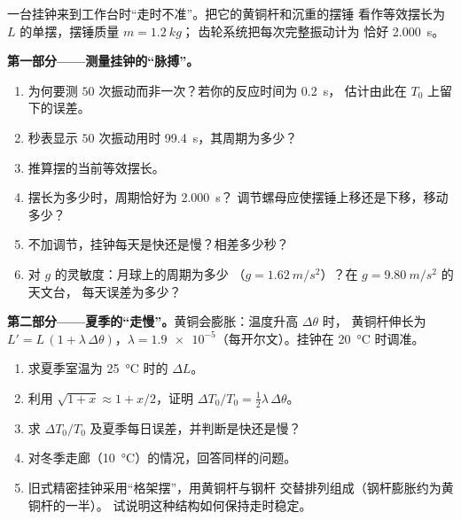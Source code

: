 \begin{problem}
\label{pb:g12:oscillators-and-time:1}
一台挂钟来到工作台时“走时不准”。把它的黄铜杆和沉重的摆锤
看作等效摆长为 $L$ 的单摆，摆锤质量 $m = \qty{1.2}{kg}$；
齿轮系统把每次完整振动计为
恰好 \qty{2.000}{s}。

\medskip
\noindent\textbf{第一部分——测量挂钟的“脉搏”。}
\begin{enumerate}
  \item 为何要测 $50$ 次振动而非一次？若你的反应时间为 \qty{0.2}{s}，
        估计由此在 $T_0$ 上留下的误差。
  \item 秒表显示 $50$ 次振动用时 \qty{99.4}{s}，其周期为多少？
  \item 推算摆的当前等效摆长。
  \item 摆长为多少时，周期恰好为 \qty{2.000}{s}？
        调节螺母应使摆锤上移还是下移，移动多少？
  \item 不加调节，挂钟每天是快还是慢？相差多少秒？
  \item 对 $g$ 的灵敏度：月球上的周期为多少
        （$g = \qty{1.62}{m/s^2}$）？在 $g = \qty{9.80}{m/s^2}$ 的天文台，
        每天误差为多少？
\end{enumerate}

\medskip
\noindent\textbf{第二部分——夏季的“走慢”。}黄铜会膨胀：温度升高 $\Delta\theta$ 时，
黄铜杆伸长为 $L' = L\,(1 + \lambda\,
\Delta\theta)$，$\lambda = \num{1.9e-5}$（每开尔文）。挂钟在
\qty{20}{\celsius} 时调准。
\begin{enumerate}[resume]
  \item 求夏季室温为 \qty{25}{\celsius} 时的 $\Delta L$。
  \item 利用 $\sqrt{1+x} \approx 1 + x/2$，证明
        $\Delta T_0 / T_0 = \tfrac12 \lambda\, \Delta\theta$。
  \item 求 $\Delta T_0/T_0$ 及夏季每日误差，并判断是快还是慢？
  \item 对冬季走廊（\qty{10}{\celsius}）的情况，回答同样的问题。
  \item 旧式精密挂钟采用“格架摆”，用黄铜杆与钢杆
        交替排列组成（钢杆膨胀约为黄铜杆的一半）。
        试说明这种结构如何保持走时稳定。
\end{enumerate}


\end{problem}
